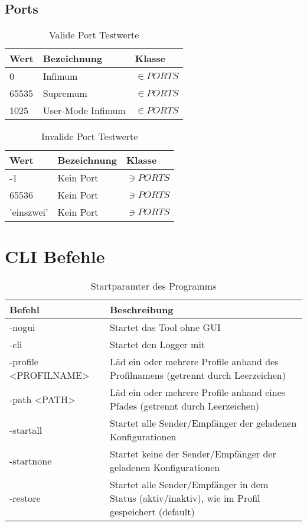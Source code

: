 \subsection{Ports}

\begin{table}[H]
\center
\begin{tabular}{l | l | l}
\textbf{Wert} & \textbf{Bezeichnung} & \textbf{Klasse}\\
\hline \hline
0 & Infimum & $\in PORTS$\\
65535 & Supremum & $\in PORTS$\\
1025 & User-Mode Infimum & $\in PORTS$
\end{tabular}
\caption{Valide Port Testwerte}
\end{table}

\begin{table}[H]
\center
\begin{tabular}{l | l | l}
\textbf{Wert} & \textbf{Bezeichnung} & \textbf{Klasse} \\
\hline \hline
-1 & Kein Port & $\ni PORTS $\\
65536 & Kein Port & $\ni PORTS $\\
'einszwei' & Kein Port & $\ni PORTS $
\end{tabular}
\caption{Invalide Port Testwerte}
\end{table}

\section{CLI Befehle}

\begin{table}[H]
\center
\begin{tabular}{p{5cm} | p{10cm}}
\textbf{Befehl} & \textbf{Beschreibung}\\
\hline \hline
-nogui & Startet das Tool ohne GUI\\
-cli & Startet den Logger mit\\
-profile <PROFILNAME> & Läd ein oder mehrere Profile anhand des
Profilnamens (getrennt durch Leerzeichen)\\
-path <PATH> & Läd ein oder mehrere Profile anhand eines Pfades (getrennt durch
Leerzeichen)\\
-startall & Startet alle Sender/Empfänger der geladenen Konfigurationen\\
-startnone & Startet keine der Sender/Empfänger der geladenen Konfigurationen\\
-restore & Startet alle Sender/Empfänger in dem Status (aktiv/inaktiv), wie im
Profil gespeichert (default)\\
\end{tabular}
\caption{Startparamter des Programms}
\end{table}